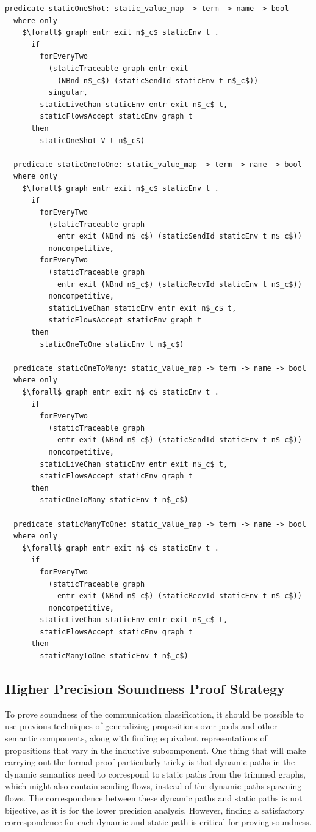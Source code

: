 \documentclass[letterpaper, 11pt]{extarticle}
\begin{document}
\begin{lstlisting}[language=logic, mathescape]
  predicate staticOneShot: static_value_map -> term -> name -> bool
  where only
    $\forall$ graph entr exit n$_c$ staticEnv t . 
      if
        forEveryTwo
          (staticTraceable graph entr exit
            (NBnd n$_c$) (staticSendId staticEnv t n$_c$))
          singular, 
        staticLiveChan staticEnv entr exit n$_c$ t, 
        staticFlowsAccept staticEnv graph t
      then
        staticOneShot V t n$_c$)

  predicate staticOneToOne: static_value_map -> term -> name -> bool
  where only
    $\forall$ graph entr exit n$_c$ staticEnv t .
      if
        forEveryTwo
          (staticTraceable graph
            entr exit (NBnd n$_c$) (staticSendId staticEnv t n$_c$))
          noncompetitive, 
        forEveryTwo
          (staticTraceable graph
            entr exit (NBnd n$_c$) (staticRecvId staticEnv t n$_c$))
          noncompetitive,
          staticLiveChan staticEnv entr exit n$_c$ t,
          staticFlowsAccept staticEnv graph t
      then
        staticOneToOne staticEnv t n$_c$)

  predicate staticOneToMany: static_value_map -> term -> name -> bool
  where only
    $\forall$ graph entr exit n$_c$ staticEnv t .
      if
        forEveryTwo
          (staticTraceable graph
            entr exit (NBnd n$_c$) (staticSendId staticEnv t n$_c$))
          noncompetitive,
        staticLiveChan staticEnv entr exit n$_c$ t,
        staticFlowsAccept staticEnv graph t
      then
        staticOneToMany staticEnv t n$_c$)

  predicate staticManyToOne: static_value_map -> term -> name -> bool
  where only
    $\forall$ graph entr exit n$_c$ staticEnv t .
      if
        forEveryTwo
          (staticTraceable graph
            entr exit (NBnd n$_c$) (staticRecvId staticEnv t n$_c$))
          noncompetitive, 
        staticLiveChan staticEnv entr exit n$_c$ t,
        staticFlowsAccept staticEnv graph t
      then
        staticManyToOne staticEnv t n$_c$)
  \end{lstlisting}


\subsection{Higher Precision Soundness Proof Strategy}
To prove soundness of the communication classification, it should be possible to use
previous techniques of generalizing propositions over pools and other semantic components,
along with finding equivalent representations of propositions that vary in the inductive
subcomponent. One thing that will make carrying out the formal proof particularly tricky is
that dynamic paths in the dynamic semantics need to correspond to static paths from
the trimmed graphs, which might also contain sending flows,
instead of the dynamic paths spawning flows.
The correspondence between these dynamic paths and static paths
is not bijective, as it is for the lower precision analysis. However, finding a satisfactory
correspondence for each dynamic and static path is critical for proving soundness.
\end{document}
